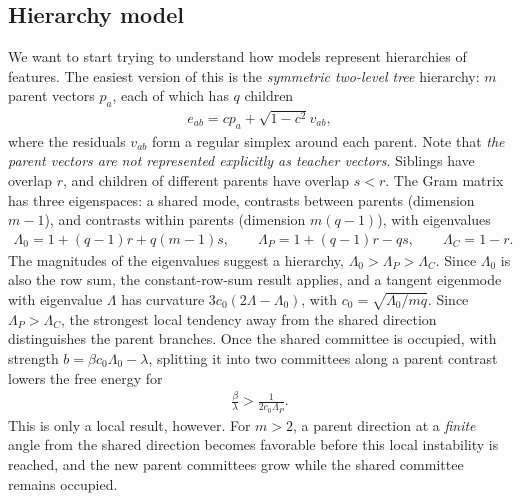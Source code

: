 \documentclass[midterm]{sparreport}
\theoremstyle{definition}
\begin{document}
\subsection{Hierarchy model}

We want to start trying to understand how models represent hierarchies of features.
The easiest version of this is the \emph{symmetric two-level tree} hierarchy: $m$ parent vectors $p_a$, each of which has $q$ children
\begin{align*}
    e_{ab} = c p_a + \sqrt{1-c^2} v_{ab},
\end{align*}
where the residuals $v_{ab}$ form a regular simplex around each parent.
Note that \emph{the parent vectors are not represented explicitly as teacher vectors}.
Siblings have overlap $r$, and children of different parents have overlap $s < r$.
The Gram matrix has three eigenspaces: a shared mode, contrasts between parents (dimension $m-1$), and contrasts within parents (dimension $m(q-1)$), with eigenvalues
\begin{align*}
    \Lambda_0 = 1 + (q-1)r + q(m-1)s,
    \qquad
    \Lambda_P = 1 + (q-1)r - qs,
    \qquad
    \Lambda_C = 1 - r.
\end{align*}
The magnitudes of the eigenvalues suggest a hierarchy, $\Lambda_0 > \Lambda_P > \Lambda_C$.
Since $\Lambda_0$ is also the row sum, the constant-row-sum result applies, and a tangent eigenmode with eigenvalue $\Lambda$ has curvature $3c_0(2\Lambda - \Lambda_0)$, with $c_0 = \sqrt{\Lambda_0/mq}$.
Since $\Lambda_P > \Lambda_C$, the strongest local tendency away from the shared direction distinguishes the parent branches.
Once the shared committee is occupied, with strength $b = \beta c_0\Lambda_0 - \lambda$, splitting it into two committees along a parent contrast lowers the free energy for
\begin{align*}
    \frac{\beta}{\lambda} > \frac{1}{2c_0\Lambda_P}.
\end{align*}
This is only a local result, however.
For $m > 2$, a parent direction at a \emph{finite} angle from the shared direction becomes favorable before this local instability is reached, and the new parent committees grow while the shared committee remains occupied.
\end{document}
